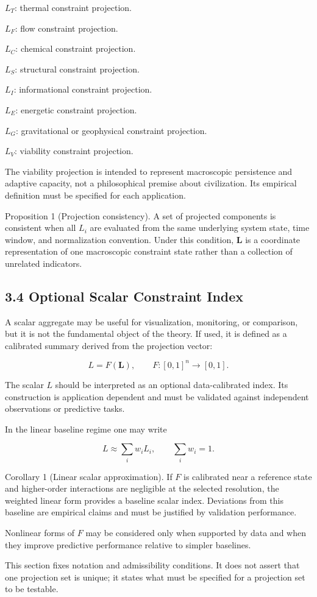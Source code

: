 \(L_T\): thermal constraint projection.

\(L_F\): flow constraint projection.

\(L_C\): chemical constraint projection.

\(L_S\): structural constraint projection.

\(L_I\): informational constraint projection.

\(L_E\): energetic constraint projection.

\(L_G\): gravitational or geophysical constraint projection.

\(L_V\): viability constraint projection.

The viability projection is intended to represent macroscopic persistence and adaptive capacity, not a philosophical premise about civilization. Its empirical definition must be specified for each application.

Proposition 1 (Projection consistency). A set of projected components is consistent when all \(L_i\) are evaluated from the same underlying system state, time window, and normalization convention. Under this condition, \(\mathbf{L}\) is a coordinate representation of one macroscopic constraint state rather than a collection of unrelated indicators.

\subsection{3.4 Optional Scalar Constraint Index}

A scalar aggregate may be useful for visualization, monitoring, or comparison, but it is not the fundamental object of the theory. If used, it is defined as a calibrated summary derived from the projection vector:

\[ L=F(\mathbf{L}), \qquad F:[0,1]^n\rightarrow[0,1]. \]

The scalar \(L\) should be interpreted as an optional data-calibrated index. Its construction is application dependent and must be validated against independent observations or predictive tasks.

In the linear baseline regime one may write

\[ L\approx\sum_i w_i L_i, \qquad \sum_i w_i=1. \]

Corollary 1 (Linear scalar approximation). If \(F\) is calibrated near a reference state and higher-order interactions are negligible at the selected resolution, the weighted linear form provides a baseline scalar index. Deviations from this baseline are empirical claims and must be justified by validation performance.

Nonlinear forms of \(F\) may be considered only when supported by data and when they improve predictive performance relative to simpler baselines.

This section fixes notation and admissibility conditions. It does not assert that one projection set is unique; it states what must be specified for a projection set to be testable.


